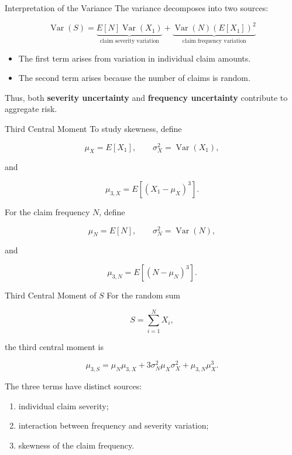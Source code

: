 \documentclass[
  ignorenonframetext,
  aspectratio=169,
]{beamer}
\providecommand{\tightlist}{%
  \setlength{\itemsep}{0pt}\setlength{\parskip}{0pt}}
\begin{document}
\begin{frame}{Interpretation of the Variance}
\protect{}\label{interpretation-of-the-variance}
The variance decomposes into two sources:

\[
\boxed{
\operatorname{Var}(S)
=
\underbrace{E[N]\operatorname{Var}(X_1)}
_{\text{claim severity variation}}
+
\underbrace{\operatorname{Var}(N)(E[X_1])^2}
_{\text{claim frequency variation}}
}
\]

\begin{itemize}
\tightlist
\item
  The first term arises from variation in individual claim amounts.
\item
  The second term arises because the number of claims is random.
\end{itemize}

Thus, both \textbf{severity uncertainty} and \textbf{frequency
uncertainty} contribute to aggregate risk.
\end{frame}

\begin{frame}{Third Central Moment}
\protect{}\label{third-central-moment}
To study skewness, define

\[
\mu_X=E[X_1],
\qquad
\sigma_X^2=\operatorname{Var}(X_1),
\]

and

\[
\mu_{3,X}
=
E[(X_1-\mu_X)^3].
\]

For the claim frequency \(N\), define

\[
\mu_N=E[N],
\qquad
\sigma_N^2=\operatorname{Var}(N),
\]

and

\[
\mu_{3,N}
=
E[(N-\mu_N)^3].
\]
\end{frame}

\begin{frame}{Third Central Moment of \(S\)}
\protect{}\label{third-central-moment-of-s}
For the random sum

\[
S=\sum_{i=1}^{N}X_i,
\]

the third central moment is

\[
\boxed{
\mu_{3,S}
=
\mu_N\mu_{3,X}
+
3\sigma_N^2\mu_X\sigma_X^2
+
\mu_{3,N}\mu_X^3
}.
\]

The three terms have distinct sources:

\begin{enumerate}
\tightlist
\item
  individual claim severity;
\item
  interaction between frequency and severity variation;
\item
  skewness of the claim frequency.
\end{enumerate}
\end{frame}
\end{document}
